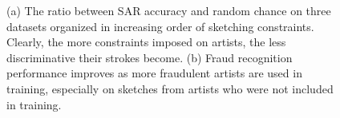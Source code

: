\begin{figure}[htbp!]
\centering
{}\hspace{-3mm}
\vspace{-2mm}\caption{(a) The ratio between SAR accuracy and random chance on three datasets organized in increasing order of sketching constraints. Clearly, the more constraints imposed on artists, the less discriminative their strokes become. (b) Fraud recognition performance improves as more fraudulent artists are used in training, especially on sketches from artists who were not included in training.}\vspace{-3mm}
\end{figure}


